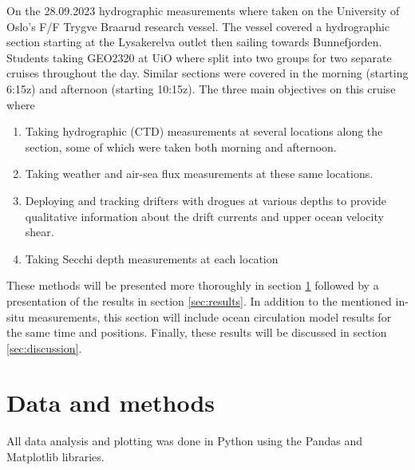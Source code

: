 \documentclass[a4paper,10pt,english]{article}
\begin{document}
On the 28.09.2023 hydrographic measurements where taken on the University of Oslo's F/F Trygve Braarud research vessel. The vessel covered a hydrographic section starting at the Lysakerelva outlet then sailing towards Bunnefjorden. Students taking GEO2320 at UiO where split into two groups for two separate cruises throughout the day. Similar sections were covered in the morning (starting 6:15z) and afternoon (starting 10:15z). The three main objectives on this cruise where
\begin{enumerate}[label=(\roman*)]
        \item Taking hydrographic (CTD) measurements at several locations
        along the section, some of which were taken both morning and afternoon.
        \item Taking weather and air-sea flux
        measurements at these same locations.
       \item Deploying and tracking drifters with drogues at
        various depths to provide qualitative information about the drift currents and upper ocean velocity shear.
        \item Taking Secchi depth measurements at each location
\end{enumerate}
These methods will be presented more thoroughly in section \ref*{sec:methods} followed by a presentation of the results in section \ref*{sec:results}. In addition to the mentioned in-situ measurements, this section will include ocean circulation model results for the same time and positions. Finally, these results will be discussed in section \ref*{sec:discussion}.%

\newpage
\section{Data and methods}\label{sec:methods}
All data analysis and plotting was done in Python using the Pandas and Matplotlib libraries.
\end{document}
